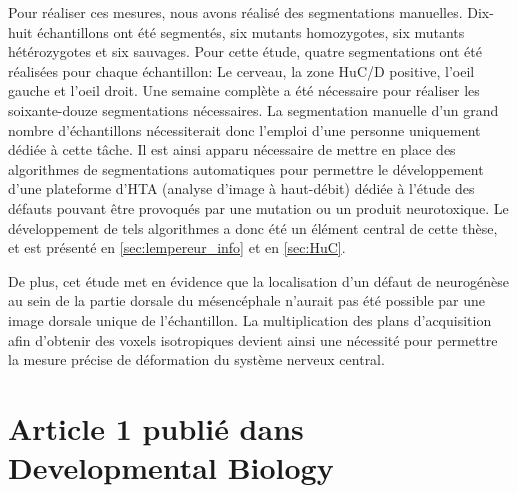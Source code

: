 \documentclass[\main/main.tex]{subfiles}
\begin{document}
%
Pour réaliser ces mesures, nous avons réalisé des segmentations manuelles.
%
Dix-huit échantillons ont été segmentés,
six mutants homozygotes, six mutants hétérozygotes et six sauvages.
%
Pour cette étude, quatre segmentations ont été réalisées pour chaque échantillon:
Le cerveau, la zone HuC/D positive, l'oeil gauche et l'oeil droit.
%
Une semaine complète a été nécessaire pour réaliser les soixante-douze segmentations nécessaires.
%
La segmentation manuelle d'un grand nombre d'échantillons
nécessiterait donc l'emploi d'une personne uniquement dédiée à cette tâche.
%
Il est ainsi apparu nécessaire de mettre en place des algorithmes de segmentations automatiques
pour permettre le développement d'une plateforme d'HTA (analyse d'image à haut-débit) dédiée à l'étude
des défauts pouvant être provoqués par une mutation ou un produit neurotoxique.
%
Le développement de tels algorithmes a donc été un élément central de cette thèse, et est présenté en \autoref{sec:lempereur_info} et en \autoref{sec:HuC}.

De plus, cet étude met en évidence que la localisation d'un défaut de neurogénèse au sein de la partie dorsale du
mésencéphale n'aurait pas été possible par une image dorsale unique de l'échantillon.
%
La multiplication des plans d'acquisition  afin d'obtenir des voxels isotropiques devient ainsi une nécessité
pour permettre la mesure précise de déformation du système nerveux central.

\section{Article 1 publié dans Developmental Biology}


\end{document}
